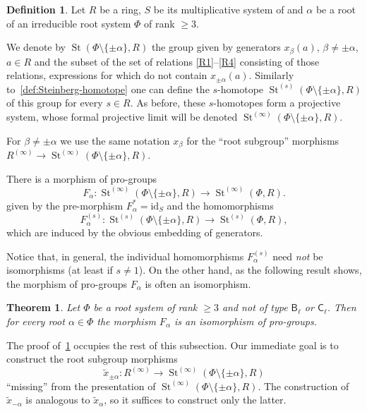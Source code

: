 \documentclass{article}
\numberwithin{equation}{section}
\newtheorem{theorem}{Theorem}
\theoremstyle{definition}
\newtheorem{df}[lemma]{Definition} \Crefname{df}{Definition}{Definitions}
\theoremstyle{remark}
\DeclareMathOperator\St{St}
\newcommand{\rB}{\mathsf{B}}
\newcommand{\rC}{\mathsf{C}}
\begin{document}
\begin{df}
Let $R$ be a ring, $S$ be its multiplicative system of and $\alpha$ be a root of an irreducible root system $\Phi$ of rank $\geq 3$. 

We denote by $\St(\Phi\setminus\{\pm \alpha\}, R)$ the group given by generators $x_\beta(a)$, $\beta \neq \pm \alpha$, $a\in R$ and the subset of the set of relations \eqref{R1}--\eqref{R4} consisting of those relations, expressions for which do not contain $x_{\pm\alpha}(a)$.
Similarly to~\cref{def:Steinberg-homotope} one can define the $s$-homotope $\St^{(s)}(\Phi\setminus\{\pm \alpha\}, R)$ of this group for every $s\in R$. 
As before, these $s$-homotopes form a projective system, whose formal projective limit will be denoted $\St^{(\infty)}(\Phi \setminus\{\pm \alpha\}, R)$. 
\end{df}

For $\beta \neq \pm\alpha$ we use the same notation $x_\beta$ for the ``root subgroup'' morphisms $R^{(\infty)}\to \St^{(\infty)}(\Phi \setminus\{\pm\alpha\}, R)$.

There is a morphism of pro-groups
\[ F_\alpha \colon \St^{(\infty)}(\Phi \setminus\{\pm\alpha\}, R) \to \St^{(\infty)}(\Phi, R). \]
given by the pre-morphism $F_\alpha^{*} = \mathrm{id}_S$ and the homomorphisms \[F_\alpha^{(s)} \colon \St^{(s)}(\Phi \setminus\{\pm\alpha\}, R) \to \St^{(s)}(\Phi, R),\] which are induced by the obvious embedding of generators.

Notice that, in general, the individual homomorphisms $F_\alpha^{(s)}$ need {\it not} be isomorphisms (at least if $s \neq 1$). On the other hand, as the following result shows, the morphism of pro-groups $F_\alpha$ is often an isomorphism. 
\begin{theorem}\label{SingleRootElimination}
 Let \(\Phi\) be a root system of rank \(\geq 3\) and not of type \(\rB_\ell\) or \(\rC_\ell\). Then for every root \(\alpha \in \Phi\) the morphism $F_\alpha$ is an isomorphism of pro-groups.
\end{theorem}
The proof of~\cref{SingleRootElimination} occupies the rest of this subsection.
Our immediate goal is to construct the root subgroup morphisms
\[\widetilde x_{\pm \alpha} \colon R^{(\infty)} \to \St^{(\infty)}(\Phi \setminus \{\pm \alpha\}, R) \] ``missing'' from the presentation of $\St^{(\infty)}(\Phi\setminus\{\pm\alpha\}, R)$. The construction of $\widetilde{x}_{-\alpha}$ is analogous to $\widetilde{x}_\alpha$, so it suffices to construct only the latter.

\end{document}
